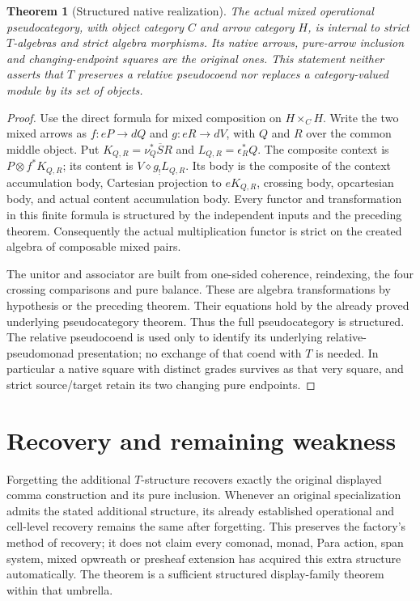 \documentclass[11pt]{article}
\newtheorem{theorem}{Theorem}
\begin{document}
\begin{theorem}[Structured native realization]
The actual mixed operational pseudocategory, with object category $C$ and arrow category $H$, is internal to strict $T$-algebras and strict algebra morphisms. Its native arrows, pure-arrow inclusion and changing-endpoint squares are the original ones. This statement neither asserts that $T$ preserves a relative pseudocoend nor replaces a category-valued module by its set of objects.
\end{theorem}
\begin{proof}
Use the direct formula for mixed composition on $H\times_C H$. Write the two mixed arrows as $f:eP\to dQ$ and $g:eR\to dV$, with $Q$ and $R$ over the common middle object. Put $K_{Q,R}=\nu_Q^*\overline S R$ and $L_{Q,R}=\epsilon_R^*Q$. The composite context is $P\otimes f^*K_{Q,R}$; its content is $V\diamond g_!L_{Q,R}$. Its body is the composite of the context accumulation body, Cartesian projection to $eK_{Q,R}$, crossing body, opcartesian body, and actual content accumulation body. Every functor and transformation in this finite formula is structured by the independent inputs and the preceding theorem. Consequently the actual multiplication functor is strict on the created algebra of composable mixed pairs.

The unitor and associator are built from one-sided coherence, reindexing, the four crossing comparisons and pure balance. These are algebra transformations by hypothesis or the preceding theorem. Their equations hold by the already proved underlying pseudocategory theorem. Thus the full pseudocategory is structured. The relative pseudocoend is used only to identify its underlying relative-pseudomonad presentation; no exchange of that coend with $T$ is needed. In particular a native square with distinct grades survives as that very square, and strict source/target retain its two changing pure endpoints.
\end{proof}

\section{Recovery and remaining weakness}
Forgetting the additional $T$-structure recovers exactly the original displayed comma construction and its pure inclusion. Whenever an original specialization admits the stated additional structure, its already established operational and cell-level recovery remains the same after forgetting. This preserves the factory's method of recovery; it does not claim every comonad, monad, Para action, span system, mixed opwreath or presheaf extension has acquired this extra structure automatically. The theorem is a sufficient structured display-family theorem within that umbrella.
\end{document}
